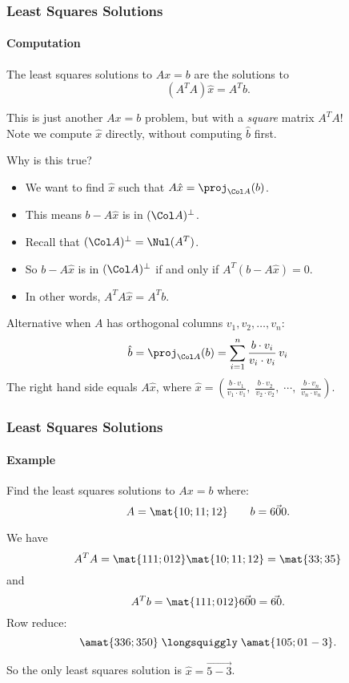 
\begin{frame}
\frametitle{Least Squares Solutions}
\framesubtitle{Computation}

\vskip-3mm
\begin{thm}
  The least squares solutions to $Ax=b$ are the solutions to 
  \displayskips{3pt}
  \[ (A^TA)\hat x = A^Tb. \]
\end{thm}

\pause
This is just another $Ax=b$ problem, but with a \emph{square} matrix $A^TA$!
\pause\\
Note we compute $\hat x$ directly, without computing $\hat b$ first.

\pause\medskip
\alert{Why is this true?}
\begin{webonly}
\begin{itemize}
\item We want to find $\hat x$ such that $A\hat x = \proj_{\Col A}(b)$.
\item This means $b-A\hat x$ is in $(\Col A)^\perp$.
\item Recall that $(\Col A)^\perp = \Nul(A^T)$.
\item So $b-A\hat x$ is in $(\Col A)^\perp$ if and only if $A^T(b-A\hat x) = 0$.
\item In other words, $A^T A\hat x = A^T b$.
\end{itemize}
\end{webonly}

\pause\medskip
\alert{Alternative when $A$ has orthogonal columns $v_1,v_2,\ldots,v_n$:}
\displayskips{2pt}
\[ \hat b = \proj_{\Col A}(b)
= \sum_{i=1}^n \frac{b\cdot v_i}{v_i\cdot v_i}\,v_i \]
The right hand side equals $A\hat x$, where $\displaystyle\hat x = \left(
  \frac{b\cdot v_1}{v_1\cdot v_1},\;
  \frac{b\cdot v_2}{v_2\cdot v_2},\;
  \cdots,\;
  \frac{b\cdot v_n}{v_n\cdot v_n}
 \right).$

\end{frame}



\begin{frame}
\frametitle{Least Squares Solutions}
\framesubtitle{Example}

Find the least squares solutions to $Ax=b$ where:
\[ A = \mat{1 0; 1 1; 1 2} \qquad b = \vec{6 0 0}. \]

\begin{webonly}
  We have
  \[ A^TA = \mat{1 1 1; 0 1 2}\mat{1 0; 1 1; 1 2} = \mat{3 3; 3 5} \]
  and
  \[ A^T b = \mat{1 1 1; 0 1 2}\vec{6 0 0} = \vec{6 0}. \]
  Row reduce:
  \[ \amat{3 3 6; 3 5 0} \;\longsquiggly\; \amat{1 0 5; 0 1 -3}. \]
\end{webonly}%
\pause
So the only least squares solution is $\hat x = \vec{5 -3}$.

\end{frame}


